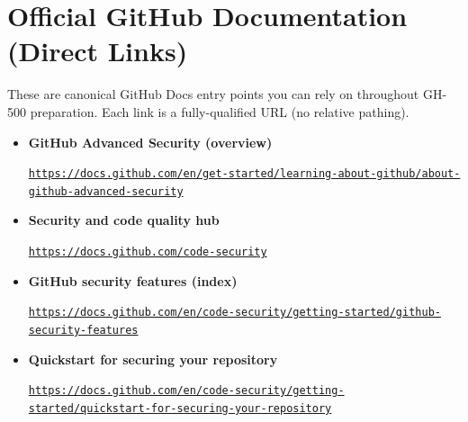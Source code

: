 \documentclass[11pt]{article}
\newcommand{\DocLink}[2]{%
  \item \textbf{#1}\par
  \noindent\href{#2}{\nolinkurl{#2}}%
}
\begin{document}
\section{Official GitHub Documentation (Direct Links)}
These are canonical GitHub Docs entry points you can rely on throughout GH-500 preparation. Each link is a fully-qualified URL (no relative pathing).

\begin{itemize}
  \DocLink{GitHub Advanced Security (overview)}{https://docs.github.com/en/get-started/learning-about-github/about-github-advanced-security}
  \DocLink{Security and code quality hub}{https://docs.github.com/code-security}
  \DocLink{GitHub security features (index)}{https://docs.github.com/en/code-security/getting-started/github-security-features}
  \DocLink{Quickstart for securing your repository}{https://docs.github.com/en/code-security/getting-started/quickstart-for-securing-your-repository}
\end{itemize}
\end{document}
